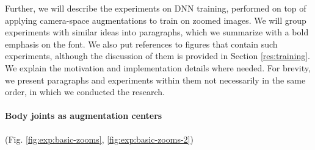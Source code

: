 
Further, we will describe the experiments on DNN training, performed on top of applying camera-space augmentations to train on zoomed images. We will group experiments with similar ideas into paragraphs, which we summarize with a bold emphasis on the font. We also put references to figures that contain such experiments, although the discussion of them is provided in Section \ref{res:training}. We explain the motivation and implementation details where needed. For brevity, we present paragraphs and experiments within them not necessarily in the same order, in which we conducted the research.

\vspace{-15pt}\paragraph{Body joints as augmentation centers}(Fig. \ref{fig:exp:basic-zooms}, \ref{fig:exp:basic-zooms-2})\mbox{}\nopagebreak

